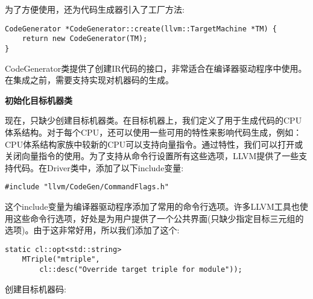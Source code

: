 为了方便使用，还为代码生成器引入了工厂方法:\par

\begin{lstlisting}[caption={}]
CodeGenerator *CodeGenerator::create(llvm::TargetMachine *TM) {
	return new CodeGenerator(TM);
}
\end{lstlisting}

CodeGenerator类提供了创建IR代码的接口，非常适合在编译器驱动程序中使用。在集成之前，需要支持实现对机器码的生成。\par

\hspace*{\fill} \par %
\textbf{初始化目标机器类}

现在，只缺少创建目标机器类。在目标机器上，我们定义了用于生成代码的CPU体系结构。对于每个CPU，还可以使用一些可用的特性来影响代码生成，例如：CPU体系结构家族中较新的CPU可以支持向量指令。通过特性，我们可以打开或关闭向量指令的使用。为了支持从命令行设置所有这些选项，LLVM提供了一些支持代码。在Driver类中，添加了以下include变量:\par

\begin{lstlisting}[caption={}]
#include "llvm/CodeGen/CommandFlags.h"
\end{lstlisting}

这个include变量为编译器驱动程序添加了常用的命令行选项。许多LLVM工具也使用这些命令行选项，好处是为用户提供了一个公共界面(只缺少指定目标三元组的选项)。由于这非常好用，所以我们添加了这个:\par

\begin{lstlisting}[caption={}]
static cl::opt<std::string>
	MTriple("mtriple",
		cl::desc("Override target triple for module"));
\end{lstlisting}

创建目标机器码:\par


